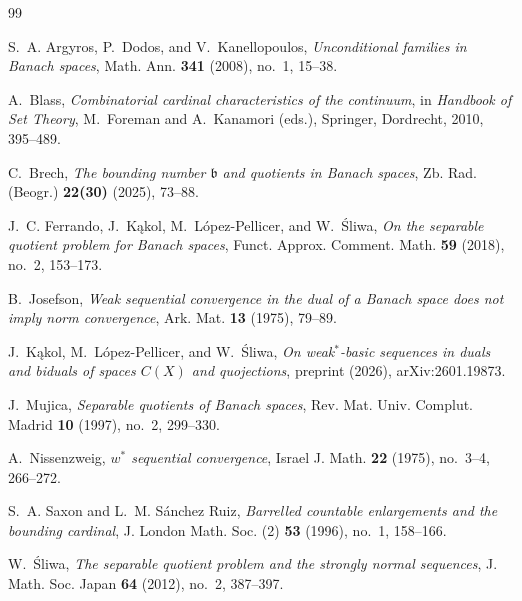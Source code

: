 \documentclass[11pt,a4paper]{amsart}
\theoremstyle{remark}
\begin{document}
\begin{thebibliography}{99}

S.~A. Argyros, P.~Dodos, and V.~Kanellopoulos,
\emph{Unconditional families in Banach spaces},
Math. Ann. \textbf{341} (2008), no.~1, 15--38.

A.~Blass,
\emph{Combinatorial cardinal characteristics of the continuum},
in \emph{Handbook of Set Theory}, M.~Foreman and A.~Kanamori (eds.),
Springer, Dordrecht, 2010, 395--489.

C.~Brech,
\emph{The bounding number $\mathfrak b$ and quotients in Banach spaces},
Zb. Rad. (Beogr.) \textbf{22(30)} (2025), 73--88.

J.~C. Ferrando, J.~K\k{a}kol, M.~L\'opez-Pellicer, and W.~\'Sliwa,
\emph{On the separable quotient problem for Banach spaces},
Funct. Approx. Comment. Math. \textbf{59} (2018), no.~2, 153--173.

B.~Josefson,
\emph{Weak sequential convergence in the dual of a Banach space does
not imply norm convergence}, Ark. Mat. \textbf{13} (1975), 79--89.

J.~K\k{a}kol, M.~L\'opez-Pellicer, and W.~\'Sliwa,
\emph{On weak$^*$-basic sequences in duals and biduals of spaces $C(X)$
and quojections}, preprint (2026), arXiv:2601.19873.

J.~Mujica,
\emph{Separable quotients of Banach spaces},
Rev. Mat. Univ. Complut. Madrid \textbf{10} (1997), no.~2, 299--330.

A.~Nissenzweig,
\emph{$w^*$ sequential convergence},
Israel J. Math. \textbf{22} (1975), no.~3--4, 266--272.

S.~A. Saxon and L.~M. S\'anchez Ruiz,
\emph{Barrelled countable enlargements and the bounding cardinal},
J. London Math. Soc. (2) \textbf{53} (1996), no.~1, 158--166.

W.~\'Sliwa,
\emph{The separable quotient problem and the strongly normal sequences},
J. Math. Soc. Japan \textbf{64} (2012), no.~2, 387--397.

\end{thebibliography}
\end{document}

